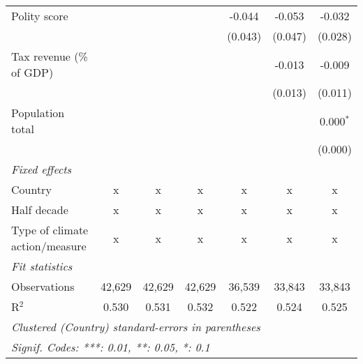 \begin{tabular}{lcccccc}
   Polity score                                                      &               &               &                & -0.044         & -0.053         & -0.032\\   
                                                                     &               &               &                & (0.043)        & (0.047)        & (0.028)\\   
   Tax revenue (\% of GDP)                                           &               &               &                &                & -0.013         & -0.009\\   
                                                                     &               &               &                &                & (0.013)        & (0.011)\\   
   Population total                                                  &               &               &                &                &                & 0.000$^{*}$\\   
                                                                     &               &               &                &                &                & (0.000)\\   
   \emph{Fixed effects}\\
   Country                                                           & x             & x             & x              & x              & x              & x\\  
   Half decade                                                       & x             & x             & x              & x              & x              & x\\  
   Type of climate action/measure                                    & x             & x             & x              & x              & x              & x\\  
   \midrule \emph{Fit statistics}\\
   Observations                                                      & 42,629        & 42,629        & 42,629         & 36,539         & 33,843         & 33,843\\  
   R$^2$                                                             & 0.530         & 0.531         & 0.532          & 0.522          & 0.524          & 0.525\\  
   \midrule
   \multicolumn{7}{l}{\emph{Clustered (Country) standard-errors in parentheses}}\\
   \multicolumn{7}{l}{\emph{Signif. Codes: ***: 0.01, **: 0.05, *: 0.1}}\\
\end{tabular}
\par\endgroup


